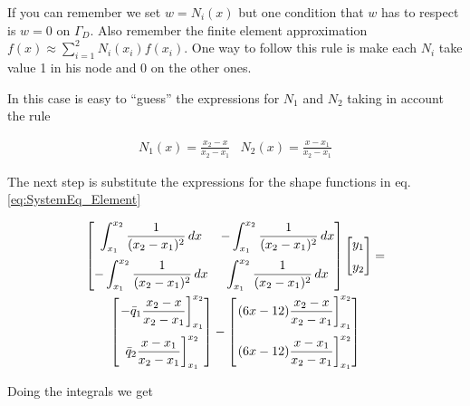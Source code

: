 \documentclass[letterpaper,10pt]{article}
\begin{document}
If you can remember we set $w=N_i(x)$ but one condition that $w$ has to respect is $w=0$ on $\Gamma_D$. Also remember the finite element approximation $f(x) \approx \sum_{i=1}^2 N_i(x_i) f(x_i)$. One way to follow this rule is make each $N_i$ take value 1 in his node and 0 on the other ones.

In this case is easy to ``guess'' the expressions for $N_1$ and $N_2$ taking in account the rule

\begin{equation}
\begin{array}{cc}
\displaystyle
N_1(x) = \frac{x_2 - x}{x_2 - x_1} & 
\displaystyle
N_2(x) = \frac{x - x_1}{x_2 - x_1}
\end{array}
\end{equation}

The next step is substitute the expressions for the shape functions in eq. \ref{eq:SystemEq_Element}

\begin{multline*}
\begin{bmatrix}
\displaystyle
\int_{x_1}^{x_2} \frac{1}{(x_2-x_1)^2} \, dx &
\displaystyle
-\int_{x_1}^{x_2} \frac{1}{(x_2-x_1)^2} \, dx \vspace{2mm} \\
\displaystyle
-\int_{x_1}^{x_2} \frac{1}{(x_2-x_1)^2} \, dx &
\displaystyle
\int_{x_1}^{x_2} \frac{1}{(x_2-x_1)^2} \, dx
\end{bmatrix}
\begin{bmatrix}
y_1 \vspace{2mm}\\
y_2
\end{bmatrix}
= \\
\begin{bmatrix}
\displaystyle
\left. -\bar{q}_1 \frac{x_2 - x}{x_2 - x_1} \right]_{x_1}^{x_2} \vspace{2mm}\\
\displaystyle
\left. \bar{q}_2 \frac{x - x_1}{x_2 - x_1} \right]_{x_1}^{x_2}
\end{bmatrix}
-
\begin{bmatrix}
\displaystyle
\left. (6x-12) \frac{x_2 - x}{x_2 - x_1} \right]_{x_1}^{x_2} \vspace{2mm}\\
\displaystyle
\left. (6x-12) \frac{x - x_1}{x_2 - x_1} \right]_{x_1}^{x_2}
\end{bmatrix}
\end{multline*}

Doing the integrals we get
\end{document}
